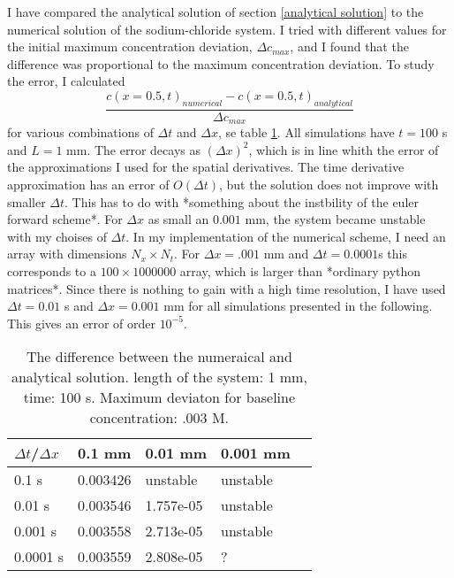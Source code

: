 \documentclass{article}
\begin{document}
I have compared the analytical solution of section \ref{analytical solution} to the numerical solution of the sodium-chloride system. I tried with different values for the initial maximum concentration deviation, $\Delta c_{max}$, and I found that the difference was proportional to the maximum concentration deviation. To study the error, I calculated
\begin{equation}
\frac{c(x=0.5,t)_{numerical}-c(x=0.5,t)_{analytical}}{\Delta c_{max}}
\end{equation}
for various combinations of $\Delta t$ and $\Delta x$, se table \ref{tab:error}. All simulations have $t = 100$ s and $L=1$ mm. The error decays as $(\Delta x)^2$, which is in line whith the error of the  approximations I used for the spatial derivatives. The time derivative approximation has an error of $O(\Delta t)$, but the solution does not improve with smaller $\Delta t$. This has to do with *something about the instbility of the euler forward scheme*.
For $\Delta x$ as small an $0.001$ mm, the system became unstable with my choises of $\Delta t$. In my implementation of the numerical scheme, I need an array with dimensions $N_x \times N_t$. For $\Delta x = .001$ mm and $\Delta t = 0.0001$s this corresponds to a $100\times 1000 000$ array, which is larger than *ordinary python matrices*. 
Since there is nothing to gain with a high time resolution, I have used $\Delta t = 0.01$ s and $\Delta x = 0.001$ mm for all simulations presented in the following. This gives an error of order $10^{-5}$. 
\begin{table}[h!]
  \centering
  \caption{The difference between the numeraical and analytical solution. length of the system: 1 mm, time: 100 s. Maximum deviaton for baseline concentration: .003 M.  }
  \label{tab:error}
  \begin{tabular}{l||l|l|l|l}
$\Delta t$/$\Delta x$ & 0.1 mm & 0.01 mm & 0.001 mm  \\
\hline
0.1 s & 0.003426 &  unstable & unstable \\
0.01 s & 0.003546 & 1.757e-05  & unstable \\
0.001 s & 0.003558 & 2.713e-05 & unstable \\
0.0001 s & 0.003559& 2.808e-05 & ? \\

 \end{tabular}
\end{table}
\end{document}

